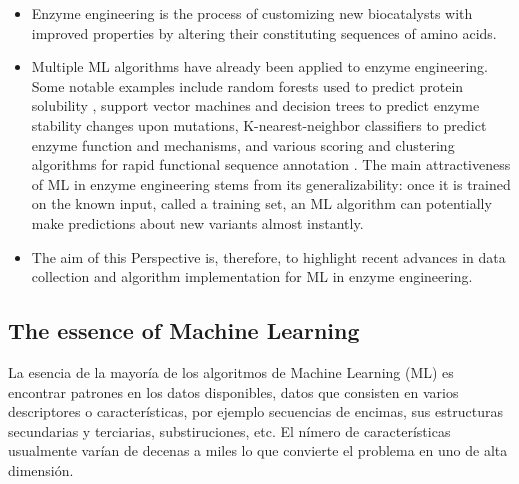 \documentclass[12pt]{article}
\begin{document}
\begin{itemize}
\item Enzyme engineering is the process of customizing new biocatalysts with improved properties by altering their constituting sequences of amino acids.

\item Multiple ML algorithms have already been applied to enzyme engineering. Some notable examples include random forests used to predict protein solubility \cite{15}, support vector machines \cite{16,17} and decision trees \cite{18} to predict enzyme stability changes upon mutations, K-nearest-neighbor classifiers to predict enzyme function\cite{19} and mechanisms,\cite{20} and various scoring and clustering algorithms for rapid functional sequence annotation \cite{21,22}. The main attractiveness of ML in enzyme engineering stems from its generalizability: once it is trained on the known input, called a training set, an ML algorithm can potentially make predictions about new variants almost instantly.

\item The aim of this Perspective is, therefore, to highlight recent advances in data collection and algorithm implementation for ML in enzyme engineering. 

\end{itemize}

\subsection{The essence of Machine Learning}

La esencia de la mayoría de los algoritmos de Machine Learning (ML) es encontrar patrones en los datos disponibles, datos que consisten en varios descriptores o características, por ejemplo secuencias de encimas, sus estructuras secundarias y terciarias, substiruciones, etc.  El nímero de características usualmente varían de decenas a miles lo que convierte el problema en uno de alta dimensión. 
\end{document}
